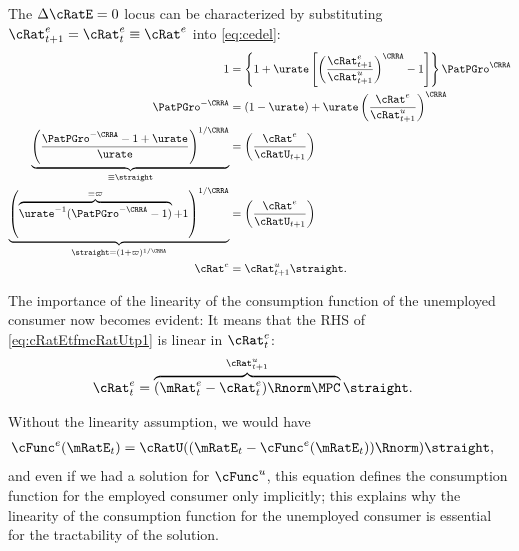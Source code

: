 \documentclass{\handout}
\begin{document}
The $\dcEqZero$ locus can be characterized by substituting ${\cRat}^{e}_{t+1}={\cRat}^{e}_{t} \equiv {\cRat}^{e}$ into \eqref{eq:cedel}:
\begin{align}
         1 & = \left\{1+\urate\left[\left(\frac{{\cRat}^{e}_{t+1}}{\cRat_{t+1}^{u}}\right)^{\CRRA}-1\right]\right\} \PatPGro^{\CRRA} \label{eq:ctp1OctEq1}
\\ \PatPGro^{-\CRRA} & =  (1-\urate)+\urate\left(\frac{{\cRat}^{e}_{\tSS}}{\cRat_{t+1}^{u} }\right)^{\CRRA} \notag
\\ \underbrace{\left(\frac{\PatPGro^{-\CRRA}-1+\urate}{\urate}\right)^{1/\CRRA}}_{\equiv \straight} & =   \left(\frac{{\cRat}^{e}_{\tSS}}{\cRatU_{t+1}}\right) \label{eq:straightDef}
\\ \underbrace{\left(\overbrace{\urate^{-1}(\PatPGro^{-\CRRA}-1)}^{\equiv \varpi}+1\right)^{1/\CRRA}}_{\straight=(1+\varpi)^{1/\CRRA}} & =   \left(\frac{{\cRat}^{e}_{\tSS}}{\cRatU_{t+1}}\right) \notag %
\\      {\cRat}^{e}_{\tSS} & = \cRat^{u}_{t+1} \straight \label{eq:cRatEtfmcRatUtp1}.
\end{align}


The importance of the linearity of the consumption function of the unemployed consumer now becomes evident:  It means that the RHS of \eqref{eq:cRatEtfmcRatUtp1} is linear in $\cRat^{e}_{t}$:
\begin{equation}\begin{gathered}\begin{aligned}
  \cRat^{e}_{t} & =  \overbrace{(\mRat^{e}_{t}-{\cRat}^{e}_{t})\Rnorm \MPCU}^{\cRat^{u}_{t+1}} \straight \label{eq:PSTerm}.
\end{aligned}\end{gathered}\end{equation}

\begin{CDCPrivate}
Without the linearity assumption, we would have 
\begin{equation}\begin{gathered}\begin{aligned}
      \cFunc^{e}(\mRatE_{t}) & =  \cRatU((\mRatE_{t}-\cFunc^{e}(\mRatE_{t}))\Rnorm) \straight
,
\end{aligned}\end{gathered}\end{equation}
and even if we had a solution for $\cFunc^{u}$, this equation defines the consumption function for the employed consumer only implicitly; this explains why the linearity of the consumption function for the unemployed consumer is essential for the tractability of the solution.
\end{CDCPrivate}
\end{document}
